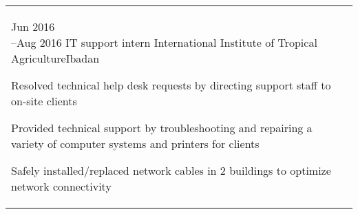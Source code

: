 \begin{tabular}{@{\raggedright}p{} |>{\raggedright\arraybackslash}p{}}
    \cvevent{Jun 2016\newline --Aug 2016}
    {IT support intern}
    {International Institute of Tropical Agriculture}{Ibadan}
    {\begin{tabitemize}
        \item Resolved technical help desk requests by directing support staff to on-site clients
        \item Provided technical support by troubleshooting and repairing a variety of computer systems and printers for clients
        \item Safely installed/replaced network cables in 2 buildings to optimize network connectivity
        \vspace{0.5em}
    \end{tabitemize}
    \vspace{-\baselineskip}\mbox{}
    }

\end{tabular}
